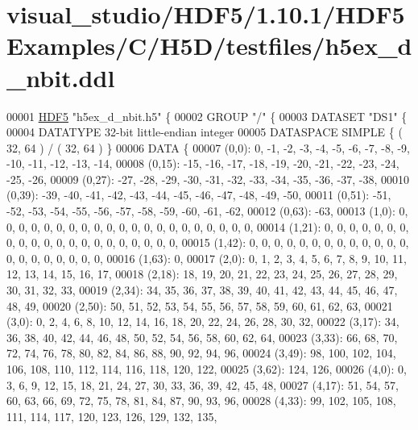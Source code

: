 \hypertarget{visual__studio_2_h_d_f5_21_810_81_2_h_d_f5_examples_2_c_2_h5_d_2testfiles_2h5ex__d__nbit_8ddl_source}{}\section{visual\+\_\+studio/\+H\+D\+F5/1.10.1/\+H\+D\+F5\+Examples/\+C/\+H5\+D/testfiles/h5ex\+\_\+d\+\_\+nbit.ddl}
\label{visual__studio_2_h_d_f5_21_810_81_2_h_d_f5_examples_2_c_2_h5_d_2testfiles_2h5ex__d__nbit_8ddl_source}

\begin{DoxyCode}
00001 \hyperlink{namespace_h_d_f5}{HDF5} \textcolor{stringliteral}{"h5ex\_d\_nbit.h5"} \{
00002 GROUP \textcolor{stringliteral}{"/"} \{
00003    DATASET \textcolor{stringliteral}{"DS1"} \{
00004       DATATYPE  32-bit little-endian integer
00005       DATASPACE  SIMPLE \{ ( 32, 64 ) / ( 32, 64 ) \}
00006       DATA \{
00007       (0,0): 0, -1, -2, -3, -4, -5, -6, -7, -8, -9, -10, -11, -12, -13, -14,
00008       (0,15): -15, -16, -17, -18, -19, -20, -21, -22, -23, -24, -25, -26,
00009       (0,27): -27, -28, -29, -30, -31, -32, -33, -34, -35, -36, -37, -38,
00010       (0,39): -39, -40, -41, -42, -43, -44, -45, -46, -47, -48, -49, -50,
00011       (0,51): -51, -52, -53, -54, -55, -56, -57, -58, -59, -60, -61, -62,
00012       (0,63): -63,
00013       (1,0): 0, 0, 0, 0, 0, 0, 0, 0, 0, 0, 0, 0, 0, 0, 0, 0, 0, 0, 0, 0, 0,
00014       (1,21): 0, 0, 0, 0, 0, 0, 0, 0, 0, 0, 0, 0, 0, 0, 0, 0, 0, 0, 0, 0, 0,
00015       (1,42): 0, 0, 0, 0, 0, 0, 0, 0, 0, 0, 0, 0, 0, 0, 0, 0, 0, 0, 0, 0, 0,
00016       (1,63): 0,
00017       (2,0): 0, 1, 2, 3, 4, 5, 6, 7, 8, 9, 10, 11, 12, 13, 14, 15, 16, 17,
00018       (2,18): 18, 19, 20, 21, 22, 23, 24, 25, 26, 27, 28, 29, 30, 31, 32, 33,
00019       (2,34): 34, 35, 36, 37, 38, 39, 40, 41, 42, 43, 44, 45, 46, 47, 48, 49,
00020       (2,50): 50, 51, 52, 53, 54, 55, 56, 57, 58, 59, 60, 61, 62, 63,
00021       (3,0): 0, 2, 4, 6, 8, 10, 12, 14, 16, 18, 20, 22, 24, 26, 28, 30, 32,
00022       (3,17): 34, 36, 38, 40, 42, 44, 46, 48, 50, 52, 54, 56, 58, 60, 62, 64,
00023       (3,33): 66, 68, 70, 72, 74, 76, 78, 80, 82, 84, 86, 88, 90, 92, 94, 96,
00024       (3,49): 98, 100, 102, 104, 106, 108, 110, 112, 114, 116, 118, 120, 122,
00025       (3,62): 124, 126,
00026       (4,0): 0, 3, 6, 9, 12, 15, 18, 21, 24, 27, 30, 33, 36, 39, 42, 45, 48,
00027       (4,17): 51, 54, 57, 60, 63, 66, 69, 72, 75, 78, 81, 84, 87, 90, 93, 96,
00028       (4,33): 99, 102, 105, 108, 111, 114, 117, 120, 123, 126, 129, 132, 135,

\end{DoxyCode}
